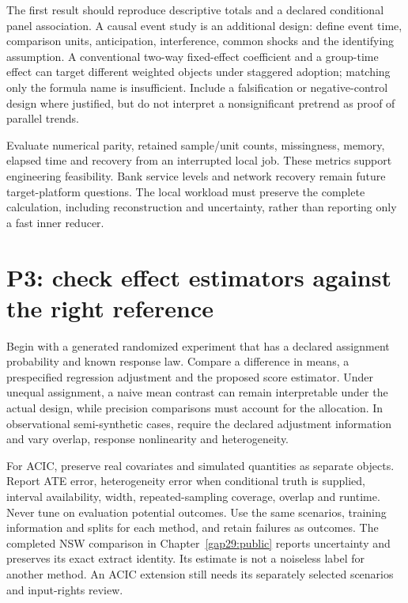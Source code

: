 The first result should reproduce descriptive totals and a declared
conditional panel association. A causal event study is an additional
design: define event time, comparison units, anticipation, interference,
common shocks and the identifying assumption. A conventional two-way
fixed-effect coefficient and a group-time effect can target different
weighted objects under staggered adoption; matching only the formula
name is insufficient. Include a falsification or negative-control design
where justified, but do not interpret a nonsignificant pretrend as proof
of parallel trends.

Evaluate numerical parity, retained sample/unit counts, missingness,
memory, elapsed time and recovery from an interrupted local job. These
metrics support engineering feasibility. Bank service levels and network
recovery remain future target-platform questions. The local workload
must preserve the complete calculation, including reconstruction and
uncertainty, rather than reporting only a fast inner reducer.

\hypertarget{p3-check-effect-estimators-against-the-right-reference}{%
\section{P3: check effect estimators against the right
reference}\label{p3-check-effect-estimators-against-the-right-reference}}

Begin with a generated randomized experiment that has a declared
assignment probability and known response law. Compare a difference in
means, a prespecified regression adjustment and the proposed score
estimator. Under unequal assignment, a naive mean contrast can remain
interpretable under the actual design, while precision comparisons must
account for the allocation. In observational semi-synthetic cases,
require the declared adjustment information and vary overlap, response
nonlinearity and heterogeneity.

For ACIC, preserve real covariates and simulated quantities as separate
objects. Report ATE error, heterogeneity error when conditional truth is
supplied, interval availability, width, repeated-sampling coverage,
overlap and runtime. Never tune on evaluation potential outcomes. Use
the same scenarios, training information and splits for each method, and
retain failures as outcomes. The completed NSW comparison in Chapter~\ref{gap29:public} reports uncertainty and preserves its exact extract identity. Its estimate is not a noiseless label for another method. An ACIC extension still needs its separately selected scenarios and input-rights review.


